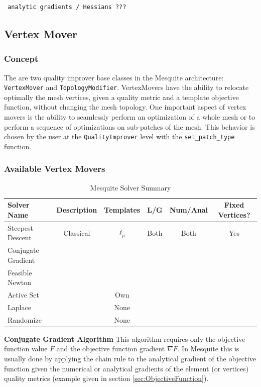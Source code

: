 \documentclass[letter]{report}
\begin{document}
\begin{verbatim} analytic gradients / Hessians ??? \end{verbatim} 

\subsection{Vertex Mover} \label{sec:VertexMover}

\subsubsection{Concept}
The are two quality improver base classes in the Mesquite architecture: \texttt{VertexMover} and
\texttt{TopologyModifier}. VertexMovers have the ability to relocate optimally the mesh vertices,
given a quality metric and a template objective function, without changing the mesh topology.
One important aspect of vertex movers is
the ability to seamlessly perform an optimization of a whole mesh or
to perform a sequence of optimizations on sub-patches of the mesh.
This behavior is chosen by the user at the \texttt{QualityImprover}
level with the \texttt{set\_patch\_type} function. 

\subsubsection{Available Vertex Movers}

\begin{table}[h]
\begin{center}
\begin{tabular}{|l|c|c|c|c|c|}
\hline
Solver Name & Description & Templates & L/G & Num/Anal & Fixed Vertices? \\ \hline
Steepest Descent & Classical & $\ell_p$ & Both & Both & Yes \\
Conjugate Gradient & & & & & \\
Feasible Newton & & & & & \\
Active Set & & Own & & & \\
Laplace & & None & & & \\
Randomize & & None & & & \\
\hline
\end{tabular}
\caption{\label{Solvers} Mesquite Solver Summary}
\end{center}
\end{table}

{\bf Conjugate Gradient Algorithm } \newline
\label{append_conjgrad}
This algorithm requires only
the objective function value $F$ and the objective function gradient $\nabla F$. 
In Mesquite this is usually done by applying the chain rule to the
analytical gradient of the objective function given the numerical or
analytical gradients of the element (or vertices) quality metrics 
(example given in section \ref{sec:ObjectiveFunction}). 
\end{document}
